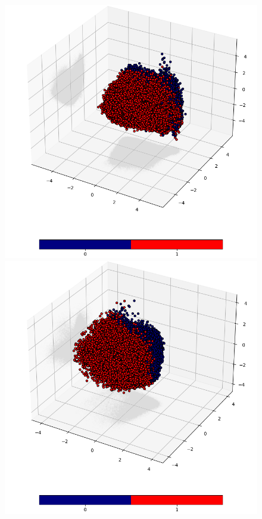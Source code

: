 \documentclass[12pt]{report}
\begin{document}
	\begin{figure}[h!]
		\centering
		\includegraphics[scale=0.3]{003_train_v2_MDE_PCA.png}
		\includegraphics[scale=0.3]{003_validate_v2_MDE_PCA.png}


\end{figure}
\end{document}
